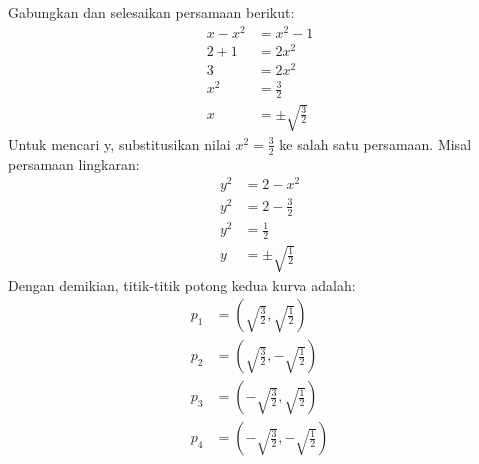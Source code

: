 \documentclass[fleqn]{article}
\begin{document}
\begin{enumerate}
			Gabungkan dan selesaikan persamaan berikut: 
			\begin{align*}
				x-x^2&=x^2-1 \\
				2+1&=2x^2 \\
				3&=2x^2 \\
				x^2&=\frac{3}{2} \\ 
				x &= \pm \sqrt{\frac{3}{2}}
			\end{align*}
			Untuk mencari y, substitusikan nilai $x^2=\frac{3}{2}$ ke salah satu persamaan. Misal persamaan lingkaran: 
			\begin{align*}
				y^2&=2-x^2 \\
				y^2&=2-\frac{3}{2} \\
				y^2&=\frac{1}{2} \\
				y&=\pm \sqrt{\frac{1}{2}}
			\end{align*}
			Dengan demikian, titik-titik potong kedua kurva adalah: 
			\begin{align*}
				p_1 &= \left( \sqrt{\frac{3}{2}},\sqrt{\frac{1}{2}} \right)\\
				p_2 &= \left( \sqrt{\frac{3}{2}},-\sqrt{\frac{1}{2}} \right)\\
				p_3 &= \left( -\sqrt{\frac{3}{2}},\sqrt{\frac{1}{2}} \right)\\
				p_4 &= \left( -\sqrt{\frac{3}{2}},-\sqrt{\frac{1}{2}} \right)\\
			\end{align*}
	\end{enumerate}
\end{document}
